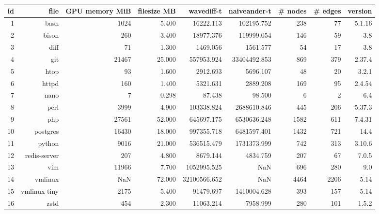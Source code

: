 \begin{table}[ht]
    \tiny
    \begin{tabular}{rrrrrrrrr}
        \toprule
        id & file         & GPU memory MiB & filesize MB & wavediff-t   & naiveander-t & \# nodes & \# edges & version \\
        \midrule
        1  & bash         & 1024           & 5.400       & 16222.113    & 102195.752   & 238      & 77       & 5.1.16  \\
        2  & bison        & 260            & 3.400       & 18977.376    & 119999.054   & 146      & 59       & 3.8     \\
        3  & diff         & 71             & 1.300       & 1469.056     & 1561.577     & 54       & 17       & 3.8     \\
        4  & git          & 21467          & 25.000      & 557953.924   & 33404492.853 & 869      & 379      & 2.37.4  \\
        5  & htop         & 93             & 1.600       & 2912.693     & 5696.107     & 48       & 20       & 3.2.1   \\
        6  & httpd        & 160            & 1.400       & 5321.631     & 2889.208     & 169      & 95       & 2.4.54  \\
        7  & nano         & 7              & 0.298       & 87.438       & 98.500       & 6        & 2        & 6.4     \\
        8  & perl         & 3999           & 4.900       & 103338.824   & 2688610.846  & 445      & 206      & 5.37.3  \\
        9  & php          & 27561          & 52.000      & 645697.175   & 6530636.248  & 1582     & 611      & 7.4.31  \\
        10 & postgres     & 16430          & 18.000      & 997355.718   & 6481597.401  & 1432     & 721      & 14.4    \\
        11 & python       & 9016           & 21.000      & 536515.479   & 1731373.999  & 742      & 313      & 3.10.6  \\
        12 & redis-server & 207            & 4.800       & 8679.144     & 4834.759     & 207      & 67       & 7.0.5   \\
        13 & vim          & 11966          & 7.700       & 1052995.525  & NaN          & 696      & 280      & 9.0     \\
        14 & vmlinux      & NaN            & 72.000      & 32100566.652 & NaN          & 4464     & 2206     & 5.14    \\
        15 & vmlinux-tiny & 2175           & 5.400       & 91479.697    & 1410004.628  & 393      & 157      & 5.14    \\
        16 & zstd         & 454            & 2.300       & 11063.214    & 7958.999     & 280      & 101      & 1.5.2   \\
        \bottomrule
    \end{tabular}


\end{table}
